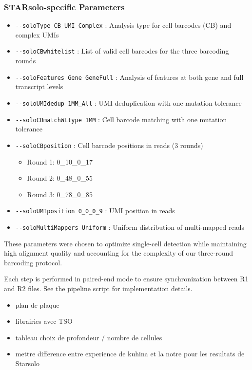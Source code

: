 \documentclass[
  11pt,
  a4paper,
]{report}
\providecommand{\tightlist}{%
  \setlength{\itemsep}{0pt}\setlength{\parskip}{0pt}}\usepackage{longtable,booktabs,array}
\begin{document}
\subsubsection{STARsolo-specific
Parameters}\label{starsolo-specific-parameters}

\begin{itemize}
\tightlist
\item
  \texttt{-\/-soloType\ CB\_UMI\_Complex} : Analysis type for cell
  barcodes (CB) and complex UMIs
\item
  \texttt{-\/-soloCBwhitelist} : List of valid cell barcodes for the
  three barcoding rounds
\item
  \texttt{-\/-soloFeatures\ Gene\ GeneFull} : Analysis of features at
  both gene and full transcript levels
\item
  \texttt{-\/-soloUMIdedup\ 1MM\_All} : UMI deduplication with one
  mutation tolerance
\item
  \texttt{-\/-soloCBmatchWLtype\ 1MM} : Cell barcode matching with one
  mutation tolerance
\item
  \texttt{-\/-soloCBposition} : Cell barcode positions in reads (3
  rounds)

  \begin{itemize}
  \tightlist
  \item
    Round 1: 0\_10\_0\_17
  \item
    Round 2: 0\_48\_0\_55
  \item
    Round 3: 0\_78\_0\_85
  \end{itemize}
\item
  \texttt{-\/-soloUMIposition\ 0\_0\_0\_9} : UMI position in reads
\item
  \texttt{-\/-soloMultiMappers\ Uniform} : Uniform distribution of
  multi-mapped reads
\end{itemize}

These parameters were chosen to optimize single-cell detection while
maintaining high alignment quality and accounting for the complexity of
our three-round barcoding protocol.

Each step is performed in paired-end mode to ensure synchronization
between R1 and R2 files. See the pipeline script for implementation
details.

\begin{itemize}
\tightlist
\item
  plan de plaque
\item
  librairies avec TSO
\item
  tableau choix de profondeur / nombre de cellules
\item
  mettre difference entre experience de kuhina et la notre pour les
  resultats de Starsolo
\end{itemize}
\end{document}
